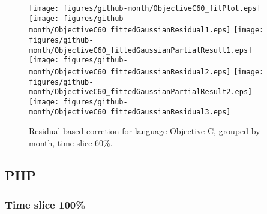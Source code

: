 \begin{figure}[hb]
\centering
{}
{\texttt{[image: figures/github-month/ObjectiveC60\_fitPlot.eps]}}
{\texttt{[image: figures/github-month/ObjectiveC60\_fittedGaussianResidual1.eps]}}
{\texttt{[image: figures/github-month/ObjectiveC60\_fittedGaussianPartialResult1.eps]}}
{\texttt{[image: figures/github-month/ObjectiveC60\_fittedGaussianResidual2.eps]}}
{\texttt{[image: figures/github-month/ObjectiveC60\_fittedGaussianPartialResult2.eps]}}
{\texttt{[image: figures/github-month/ObjectiveC60\_fittedGaussianResidual3.eps]}}
\caption{Residual-based corretion for language Objective-C, grouped by month, time slice 60\%.}
\end{figure}


\clearpage 
\newpage 


\subsection{PHP}

\FloatBarrier

\subsubsection{Time slice 100\%}

